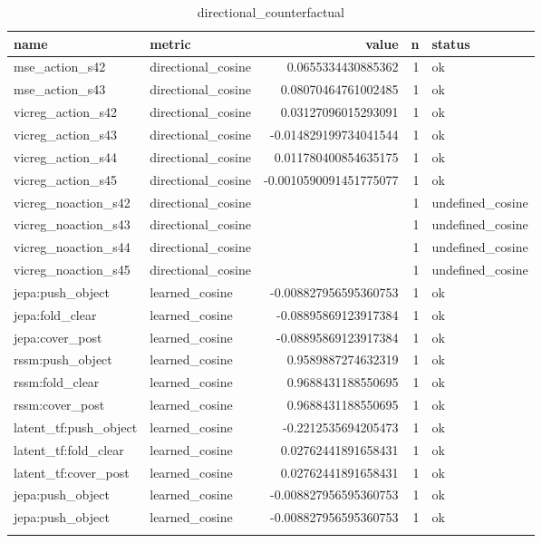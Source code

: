 \begin{table}
\centering
\begin{tabular}{llrrl}
name & metric & value & n & status \\
\hline
mse\_action\_s42 & directional\_cosine & 0.0655334430885362 & 1 & ok \\
mse\_action\_s43 & directional\_cosine & 0.08070464761002485 & 1 & ok \\
vicreg\_action\_s42 & directional\_cosine & 0.03127096015293091 & 1 & ok \\
vicreg\_action\_s43 & directional\_cosine & -0.014829199734041544 & 1 & ok \\
vicreg\_action\_s44 & directional\_cosine & 0.011780400854635175 & 1 & ok \\
vicreg\_action\_s45 & directional\_cosine & -0.0010590091451775077 & 1 & ok \\
vicreg\_noaction\_s42 & directional\_cosine &  & 1 & undefined\_cosine \\
vicreg\_noaction\_s43 & directional\_cosine &  & 1 & undefined\_cosine \\
vicreg\_noaction\_s44 & directional\_cosine &  & 1 & undefined\_cosine \\
vicreg\_noaction\_s45 & directional\_cosine &  & 1 & undefined\_cosine \\
jepa:push\_object & learned\_cosine & -0.008827956595360753 & 1 & ok \\
jepa:fold\_clear & learned\_cosine & -0.08895869123917384 & 1 & ok \\
jepa:cover\_post & learned\_cosine & -0.08895869123917384 & 1 & ok \\
rssm:push\_object & learned\_cosine & 0.9589887274632319 & 1 & ok \\
rssm:fold\_clear & learned\_cosine & 0.9688431188550695 & 1 & ok \\
rssm:cover\_post & learned\_cosine & 0.9688431188550695 & 1 & ok \\
latent\_tf:push\_object & learned\_cosine & -0.2212535694205473 & 1 & ok \\
latent\_tf:fold\_clear & learned\_cosine & 0.02762441891658431 & 1 & ok \\
latent\_tf:cover\_post & learned\_cosine & 0.02762441891658431 & 1 & ok \\
jepa:push\_object & learned\_cosine & -0.008827956595360753 & 1 & ok \\
jepa:push\_object & learned\_cosine & -0.008827956595360753 & 1 & ok \\
\caption{directional\_counterfactual}
\end{tabular}
\end{table}
